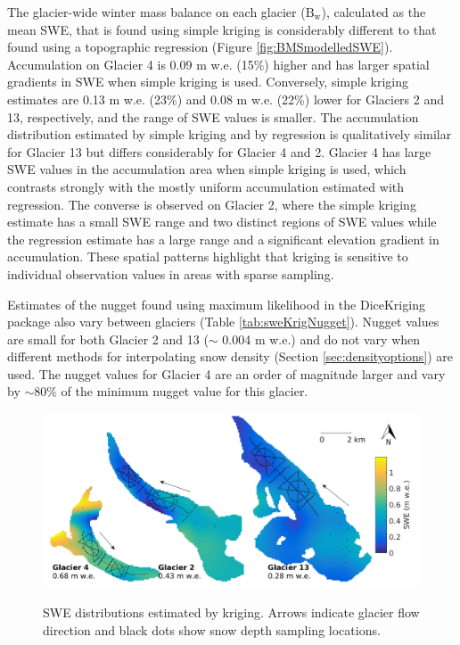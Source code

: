 \documentclass{sfuthesis}
\newcommand{\topomap}{Arrows indicate glacier flow direction and black dots show snow depth sampling locations. }
\begin{document}
The glacier-wide winter mass balance on each glacier ($\mathrm{B_w}$), calculated as the mean SWE, that is found using simple kriging is considerably different to that found using a topographic regression (Figure \ref{fig:BMSmodelledSWE}). Accumulation on Glacier 4 is 0.09 m w.e. (15\%) higher and has larger spatial gradients in SWE when simple kriging is used. Conversely, simple kriging estimates are 0.13 m w.e. (23\%) and 0.08 m w.e. (22\%) lower for Glaciers 2 and 13, respectively, and the range of SWE values is smaller. The accumulation distribution estimated by simple kriging and by regression is qualitatively similar for Glacier 13 but differs considerably for Glacier 4 and 2. Glacier 4 has large SWE values in the accumulation area when simple kriging is used, which contrasts strongly with the mostly uniform accumulation estimated with regression. The converse is observed on Glacier 2, where the simple kriging estimate has a small SWE range and two distinct regions of SWE values while the regression estimate has a large range and a significant elevation gradient in accumulation. These spatial patterns highlight that kriging is sensitive to individual observation values in areas with sparse sampling. 

Estimates of the nugget found using maximum likelihood in the DiceKriging package also vary between glaciers (Table \ref{tab:sweKrigNugget}). Nugget values are small for both Glacier 2 and 13 ($\sim$ 0.004 m w.e.) and do not vary when different methods for interpolating snow density (Section \ref{sec:densityoptions}) are used. The nugget values for Glacier 4 are an order of magnitude larger and vary by $\sim$80\% of the minimum nugget value for this glacier. 

\begin{figure}
	\centering
	\includegraphics[width = \textwidth]{sweKriged.png}\\
	\caption{SWE distributions estimated by kriging. \topomap}
	\label{fig:sweKRIGING}
\end{figure}
\end{document}
